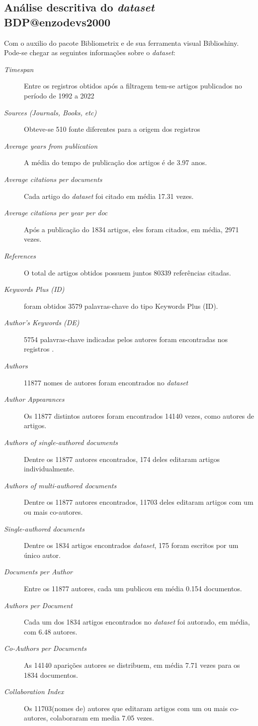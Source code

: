 \subsection{Análise descritiva do \textit{dataset}  BDP@enzodevs2000}

Com o auxilio do pacote Bibliometrix e de sua ferramenta visual Biblioshiny. Pode-se chegar as seguintes informações sobre o \textit{dataset}:

\begin{description}
    \item [\textit{Timespan}] Entre os registros obtidos após a filtragem tem-se artigos publicados no período de 1992 a 2022
    \item [\textit{Sources (Journals, Books, etc)}] Obteve-se 510 fonte diferentes para a origem dos registros
    \item [\textit{Average years from publication}] A média do tempo de publicação dos artigos é de 3.97 anos.
    \item [\textit{Average citations per documents}] Cada artigo do \textit{dataset} foi citado em média 17.31 vezes.
    \item [\textit{Average citations per year per doc}] Após a publicação do 1834 artigos, eles foram citados, em média, 2971 vezes.
    \item [\textit{References}] O total de artigos obtidos possuem juntos 80339 referências citadas.
    \item [\textit{Keywords Plus (ID)}] foram obtidos 3579 palavras-chave do tipo Keywords Plus (ID).
    \item [\textit{Author's Keywords (DE)}] 5754 palavras-chave indicadas pelos autores foram encontradas nos registros  .
    \item [\textit{Authors}] 11877 nomes de autores foram encontrados no \textit{dataset}  
    \item [\textit{Author Appearances}] Os 11877 distintos autores foram encontrados 14140 vezes, como autores de artigos.
    \item [\textit{Authors of single-authored documents}] Dentre os 11877 autores encontrados, 174 deles editaram artigos individualmente.
    \item [\textit{Authors of multi-authored documents}] Dentre os 11877 autores encontrados, 11703 deles editaram artigos com um ou mais co-autores.
    \item [\textit{Single-authored documents}] Dentre os 1834 artigos encontrados  \textit{dataset}, 175 foram escritos por um único autor.
    \item [\textit{Documents per Author}] Entre os 11877 autores, cada um publicou em média 0.154 documentos.
    \item [\textit{Authors per Document}] Cada um dos 1834 artigos encontrados no \textit{dataset} foi autorado, em média, com 6.48 autores.
    \item [\textit{Co-Authors per Documents}] As 14140 aparições autores se distribuem, em média 7.71 vezes para os 1834 documentos.
    \item [\textit{Collaboration Index}] Os 11703(nomes de) autores que editaram artigos com um ou mais co-autores, colaboraram em media 7.05 vezes.
\end{description}

